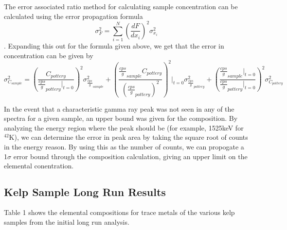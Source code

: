 \documentclass[]{article}
\begin{document}
The error associated ratio method for calculating sample concentration can be calculated using the error propagation formula $$\sigma_F^2 = \sum_{i=1}^N (\frac{dF}{dx_i})^2 \sigma_{x_i}^2$$. Expanding this out for the formula given above, we get that the error in concentration can be given by $$\sigma_{C_{sample}}^2 = (\frac{C_{pottery}}{\frac{cps}{g}_{pottery}|_{t=0}})^2\sigma_{\frac{cps}{g}_{sample}}^2 +  (\frac{\frac{cps}{g}_{sample} C_{pottery}}{(\frac{cps}{g}_{pottery})^2})^2|_{t=0}\sigma_{\frac{cps}{g}_{pottery}}^2 +  (\frac{\frac{cps}{g}_{sample}|_{t=0}}{\frac{cps}{g}_{pottery}|_{t=0}})^2\sigma_{C_{pottery}}^2$$

In the event that a characteristic gamma ray peak was not seen in any of the spectra for a given sample, an upper bound was given for the composition. By analyzing the energy region where the peak should be (for example, 1525keV for $^{42}$K), we can determine the error in peak area by taking the square root of counts in the energy reason. By using this as the number of counts, we can propogate a 1$\sigma$ error bound through the composition calculation, giving an upper limit on the elemental conentration. 

\subsection{Kelp Sample Long Run Results}

Table 1 shows the elemental compositions for trace metals of the various kelp samples from the initial long run analysis. 
\end{document}
